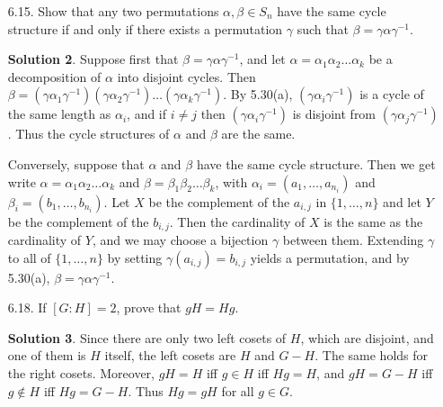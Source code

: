 \documentclass{article}
\theoremstyle{definition}
\newtheorem*{solution}{Solution}
\begin{document}
\begin{enumerate}
\begin{solution}
\begin{enumerate}
\item[(d) $\Rightarrow$ (e)] Since $g_2 = g_1h$ for some $h \in H$, $g_1^{-1}g_2 = h \in H$.
\item[(e) $\Rightarrow$ (b)] Let $g_1^{-1}g_2 = h \in H$.  We show first that $Hg_1^{-1} \subseteq Hg_2^{-1}.$  Suppose $h'g_1^{-1} \in Hg_1^{-1}$. Since $g_1^{-1} = hg_2^{-1}$, we have $h'g_1^{-1} = h'hg_2^{-1} \in Hg_2^{-1}$.  Conversely,$h''g_2^{-1} = h''h^{-1}g_1^{-1} \in Hg_1^{-1},$ so $Hg_2^{-1} \subseteq Hg_1^{-1}.$  
\item[(b) $\Rightarrow$ (a)] Since $Hg_1^{-1} = Hg_2^{-1},$ there is an $h \in H$ with $g_1^{-1} = hg_2^{-1}$, so $g_1^{-1}g_2 = h$ and $g_2 = g_1h$.  Then for any $h' \in H$, $g_2h' = g_1hh'$, so $g_2H \subseteq g_1H$.  Similarly, $g_1h' = g_2h^{-1}h'$, so $g_1H \subseteq g_2H$.
\end{enumerate}
\end{solution}
\item[6.15.] Show that any two permutations $\alpha, \beta \in S_n$ have the same cycle structure if and only if there exists a permutation $\gamma$ such that $\beta = \gamma \alpha \gamma^{-1}$.
\begin{solution}
Suppose first that $\beta = \gamma\alpha\gamma^{-1}$, and let $\alpha = \alpha_1\alpha_2\dots\alpha_k$ be a decomposition of $\alpha$ into disjoint cycles.  Then $\beta = (\gamma\alpha_1\gamma^{-1})(\gamma\alpha_2\gamma^{-1})\dots(\gamma\alpha_k\gamma^{-1})$.  By 5.30(a), $(\gamma\alpha_i\gamma^{-1})$ is a cycle of the same length as $\alpha_i$, and if $i \ne j$ then $(\gamma\alpha_i\gamma^{-1})$ is disjoint from $(\gamma\alpha_j\gamma^{-1})$.  Thus the cycle structures of $\alpha$ and $\beta$ are the same.

Conversely, suppose that $\alpha$ and $\beta$ have the same cycle structure.  Then we get write $\alpha = \alpha_1\alpha_2\dots\alpha_k$ and $\beta = \beta_1\beta_2\dots\beta_k$, with $\alpha_i = (a_1, \dots, a_{n_i})$ and $\beta_i = (b_1, \dots, b_{n_i})$.  Let $X$ be the complement of the $a_{i,j}$ in $\{1, \dots, n\}$ and let $Y$ be the complement of the $b_{i,j}$.  Then the cardinality of $X$ is the same as the cardinality of $Y$, and we may choose a bijection $\gamma$ between them.  Extending $\gamma$ to all of $\{1, \dots, n\}$ by setting $\gamma(a_{i,j}) = b_{i,j}$ yields a permutation, and by 5.30(a), $\beta = \gamma\alpha\gamma^{-1}$.
\end{solution}
\item[6.18.] If $[G:H] = 2$, prove that $gH = Hg$.
\begin{solution}
Since there are only two left cosets of $H$, which are disjoint, and one of them is $H$ itself, the left cosets are $H$ and $G - H$.  The same holds for the right cosets.  Moreover, $gH = H$ iff $g \in H$ iff $Hg = H$, and $gH = G-H$ iff $g \not\in H$ iff $Hg = G-H$.  Thus $Hg = gH$ for all $g \in G$.
\end{solution}
\end{enumerate}
\end{document}
